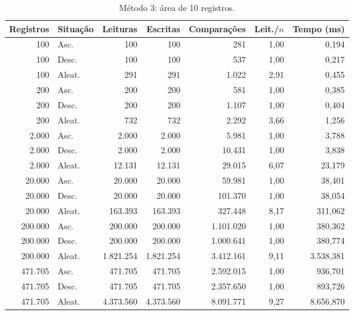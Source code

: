 \documentclass{article}
\begin{document}
\begin{table}[!htb]
    \centering
    \small
    \begin{tabular}{|r|l|r|r|r|r|r|}
        \hline\hline
        Registros & Situação & Leituras & Escritas & Comparações & Leit./$n$ & Tempo (ms) \\\hline
        100      & Asc.   &        100 &        100 &         281 &  1,00 &     0,194 \\
        100      & Desc.  &        100 &        100 &         537 &  1,00 &     0,217 \\
        100      & Aleat. &        291 &        291 &       1.022 &  2,91 &     0,455 \\\hline
        200      & Asc.   &        200 &        200 &         581 &  1,00 &     0,385 \\
        200      & Desc.  &        200 &        200 &       1.107 &  1,00 &     0,404 \\
        200      & Aleat. &        732 &        732 &       2.292 &  3,66 &     1,256 \\\hline
        2.000    & Asc.   &      2.000 &      2.000 &       5.981 &  1,00 &     3,788 \\
        2.000    & Desc.  &      2.000 &      2.000 &      10.431 &  1,00 &     3,838 \\
        2.000    & Aleat. &     12.131 &     12.131 &      29.015 &  6,07 &    23,179 \\\hline
        20.000   & Asc.   &     20.000 &     20.000 &      59.981 &  1,00 &    38,401 \\
        20.000   & Desc.  &     20.000 &     20.000 &     101.370 &  1,00 &    38,054 \\
        20.000   & Aleat. &    163.393 &    163.393 &     327.448 &  8,17 &   311,062 \\\hline
        200.000  & Asc.   &    200.000 &    200.000 &   1.101.020 &  1,00 &   380,362 \\
        200.000  & Desc.  &    200.000 &    200.000 &   1.000.641 &  1,00 &   380,774 \\
        200.000  & Aleat. &  1.821.254 &  1.821.254 &   3.412.161 &  9,11 & 3.538,381 \\\hline
        471.705  & Asc.   &    471.705 &    471.705 &   2.592.015 &  1,00 &   936,701 \\
        471.705  & Desc.  &    471.705 &    471.705 &   2.357.650 &  1,00 &   893,726 \\
        471.705  & Aleat. &  4.373.560 &  4.373.560 &   8.091.771 &  9,27 & 8.656,870 \\\hline
        \hline
    \end{tabular}
    \caption{\label{tab:m3}Método 3: área de 10 registros.}
\end{table}
\end{document}
